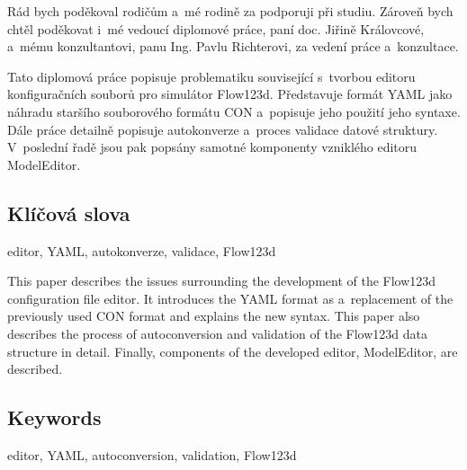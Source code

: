 \documentclass[FM,bw,DP]{tulthesis}
\begin{document}


\clearpage
\thispagestyle{empty}
\begin{acknowledgement}
Rád bych poděkoval rodičům a~mé rodině za podporuji při studiu. Zároveň bych chtěl poděkovat i~mé vedoucí diplomové práce, paní doc. Jiřině Královcové, a~mému konzultantovi, panu Ing. Pavlu Richterovi, za vedení práce a~konzultace.
\end{acknowledgement}


\begin{abstractCZ}
\thispagestyle{empty}
Tato diplomová práce popisuje problematiku související s~tvorbou editoru konfiguračních souborů pro simulátor Flow123d. Představuje formát \acrshort{YAML} jako náhradu staršího souborového formátu \acrshort{CON} a~popisuje jeho použití jeho syntaxe. Dále práce detailně popisuje autokonverze a~proces validace datové struktury. V~poslední řadě jsou pak popsány samotné komponenty vzniklého editoru ModelEditor.

\vspace{5pt}
\subsection*{Klíčová slova}
\vspace{-10pt}

editor, YAML, autokonverze, validace, Flow123d
\end{abstractCZ}

\vspace{2cm}
\begin{abstractEN}
This paper describes the issues surrounding the development of the Flow123d configuration file editor. It introduces the \acrshort{YAML} format as a~replacement of the previously used \acrshort{CON} format and explains the new syntax. This paper also describes the process of autoconversion and validation of the Flow123d data structure in detail. Finally, components of the developed editor, ModelEditor, are described.

\vspace{5pt}
\subsection*{Keywords}
\vspace{-10pt}

editor, YAML, autoconversion, validation, Flow123d
\end{abstractEN}


\renewcommand\contentsname{Obsah\vspace{-15pt}}
\tableofcontents
\clearpage
\end{document}
